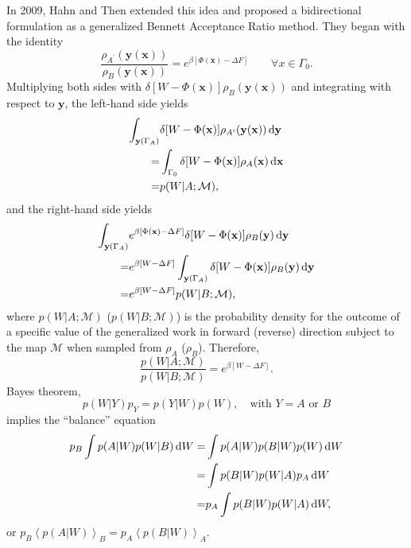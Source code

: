 In 2009, Hahn and Then extended this idea and proposed a bidirectional formulation as a generalized Bennett Acceptance Ratio method\cite{HahnPRE2009}.
They began with the identity
\begin{equation}
	\frac{\rho_{A^\prime}(\mathbf{y}(\mathbf{x}))}{\rho_B(\mathbf{y}(\mathbf{x}))}=e^{\beta\left[\Phi(\mathbf{x})-\Delta F\right]}\qquad \forall x\in \Gamma_0.
\end{equation}
Multiplying both sides with $\delta [W-\Phi(\mathbf{x})]\rho_B(\mathbf{y}(\mathbf{x}))$ and integrating with respect to $\mathbf{y}$, the left-hand side yields
\begin{align}
	\int_{\mathbf{y}(\Gamma_A)}&\delta[W-\Phi(\mathbf{x})]\rho_{A^\prime}(\mathbf{y}(\mathbf{x}))\mathop{}\!\mathrm{d} \mathbf{y}\notag\\
	                          =&\int_{\Gamma_0}\delta[W-\Phi(\mathbf{x})]\rho_A(\mathbf{x})\mathop{}\!\mathrm{d} \mathbf{x}\notag\\
	                          =&p(W|A;\mathcal{M}),
\end{align}
and the right-hand side yields
\begin{align}
	\int_{\mathbf{y}(\Gamma_A)}&e^{\beta\left[\Phi(\mathbf{x})-\Delta F\right]}\delta[W-\Phi(\mathbf{x})]\rho_B(\mathbf{y})\mathop{}\!\mathrm{d} \mathbf{y}\notag\\
	                          =&e^{\beta\left[W-\Delta F\right]}\int_{\mathbf{y}(\Gamma_A)}\delta[W-\Phi(\mathbf{x})]\rho_B(\mathbf{y})\mathop{}\!\mathrm{d} \mathbf{y}\notag\\
	                          =&e^{\beta\left[W-\Delta F\right]}p(W|B;\mathcal{M}),
\end{align}
where $p(W|A;\mathcal{M})$ ($p(W|B;\mathcal{M})$) is the probability density for the outcome of a specific value of the generalized work in forward (reverse) direction subject to the map $\mathcal{M}$ when sampled from $\rho_A$ ($\rho_B$). Therefore,
\begin{equation}
	\frac{p(W|A;\mathcal{M})}{p(W|B;\mathcal{M})}=e^{\beta\left[W-\Delta F\right]}.
	\label{Eq:FEM:TP:FluctTheo}
\end{equation}
Bayes theorem,
\begin{equation}
	p(W|Y)p_Y=p(Y|W)p(W), \quad \text{with $Y=A$ or $B$}
	\label{Eq:FEM:TP:Bayes}
\end{equation}
implies the ``balance'' equation
\begin{align}
	p_B\int p(A|W)p(W|B)\mathop{}\!\mathrm{d} W=&\int p(A|W)p(B|W)p(W)\mathop{}\!\mathrm{d} W\notag\\
	                           =&\int p(B|W)p(W|A)p_A\mathop{}\!\mathrm{d} W\notag\\
	                           =&p_A\int p(B|W)p(W|A)\mathop{}\!\mathrm{d} W,
	                           \label{Eq:FEM:TP:BalEq}
\end{align}
or $p_B\left<p(A|W)\right>_B=p_A\left<p(B|W)\right>_A$.

